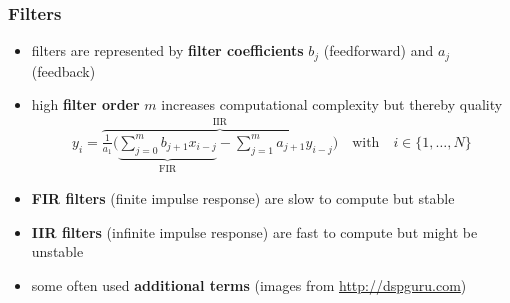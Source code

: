 \begin{frame} %
	\frametitle{Filters}
	\begin{itemize}
		\item filters are represented by \textbf{filter coefficients} $b_j$ (feedforward) and $a_j$ (feedback)
		\item high \textbf{filter order} $m$ increases computational complexity but thereby quality
			\begin{align*}
				y_i=\overbrace{\frac1{a_1}\Bigg(\underbrace{\sum_{j=0}^mb_{j+1}x_{i-j}}_{\textrm{FIR}}-\sum_{j=1}^ma_{j+1}y_{i-j}\Bigg)}^{\textrm{IIR}}\quad\textrm{with}\quad i\in\{1,\ldots,N\}
			\end{align*}
		\item \textbf{FIR filters} (finite impulse response) are slow to compute but stable
		\item \textbf{IIR filters} (infinite impulse response) are fast to compute but might be unstable
		\item some often used \textbf{additional terms} (images from \url{http://dspguru.com})
			\begin{figure}
				\centering
				\begin{subfigure}[c]{0.48\linewidth}
				\end{subfigure}
				\hspace{0.01\linewidth}
				\begin{subfigure}[c]{0.48\linewidth}
				\end{subfigure}
			\end{figure}
	\end{itemize}
\end{frame}

